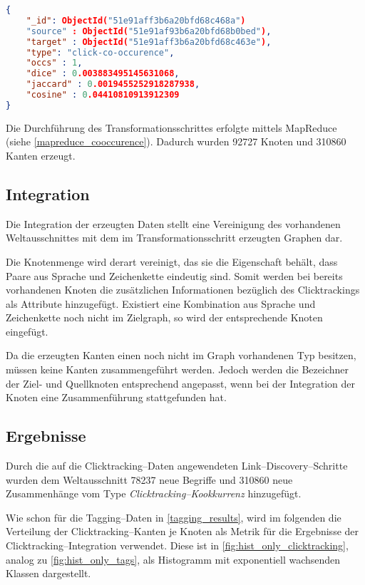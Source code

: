 \begin{lstlisting}[language=json, label={lst:click_edge}, caption={JSON--Beispiel für ein aus den Clicktracking--Daten erzeugtes Kantenobjekt}]
{
    "_id": ObjectId("51e91aff3b6a20bfd68c468a")
    "source" : ObjectId("51e91af93b6a20bfd68b0bed"),
    "target" : ObjectId("51e91aff3b6a20bfd68c463e"),
    "type": "click-co-occurence",
    "occs" : 1,
    "dice" : 0.003883495145631068,
    "jaccard" : 0.0019455252918287938,
    "cosine" : 0.04410810913912309
}
\end{lstlisting}

Die Durchführung des Transformationsschrittes erfolgte mittels MapReduce (siehe \cref{mapreduce_cooccurence}). Dadurch wurden \num{92727} Knoten und \num{310860} Kanten erzeugt.

\subsection{Integration}
\label{click_integration}

Die Integration der erzeugten Daten stellt eine Vereinigung des vorhandenen Weltausschnittes mit dem im Transformationsschritt erzeugten Graphen dar.

Die Knotenmenge wird derart vereinigt, das sie die Eigenschaft behält, dass Paare aus Sprache und Zeichenkette eindeutig sind. Somit werden bei bereits vorhandenen Knoten die zusätzlichen Informationen bezüglich des Clicktrackings als Attribute hinzugefügt. Existiert eine Kombination aus Sprache und Zeichenkette noch nicht im Zielgraph, so wird der entsprechende Knoten eingefügt.

Da die erzeugten Kanten einen noch nicht im Graph vorhandenen Typ besitzen, müssen keine Kanten zusammengeführt werden. Jedoch werden die Bezeichner der Ziel- und Quellknoten entsprechend angepasst, wenn bei der Integration der Knoten eine Zusammenführung stattgefunden hat.

\subsection{Ergebnisse}

Durch die auf die Clicktracking--Daten angewendeten Link--Discovery--Schritte wurden dem Weltausschnitt \num{78237} neue Begriffe und \num{310860} neue Zusammenhänge vom Type \emph{Clicktracking--Kookkurrenz} hinzugefügt.

Wie schon für die Tagging--Daten in \cref{tagging_results}, wird im folgenden die Verteilung der Clicktracking--Kanten je Knoten als Metrik für die Ergebnisse der Clicktracking--Integration verwendet. Diese ist in \cref{fig:hist_only_clicktracking}, analog zu \cref{fig:hist_only_tags}, als Histogramm mit exponentiell wachsenden Klassen dargestellt.

